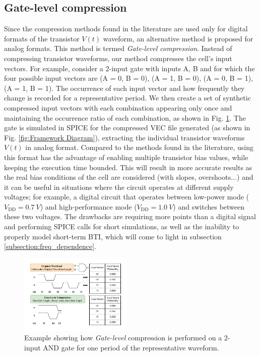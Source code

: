 \subsection{Gate-level compression}
Since the compression methods found in the literature are used only for digital formats of the transistor $V(t)$ waveform, an alternative method is proposed for analog formats. This method is termed \textit{Gate-level compression}. Instead of compressing transistor waveforms, our method compresses the cell's input vectors. For example, consider a 2-input gate with inputs A, B and for which the four possible input vectors are (A = 0, B = 0), (A = 1, B = 0), (A = 0, B = 1), (A = 1, B = 1). The occurrence of each input vector and how frequently they change is recorded for a representative period. We then create a set of synthetic compressed input vectors with each combination appearing only once and maintaining the occurrence ratio of each combination, as shown in Fig. \ref{fig:GateLevelCompression}. The gate is simulated in SPICE for the compressed VEC file generated (as shown in Fig. \ref{fig:Framework Diagram}), extracting the individual transistor waveforms $V(t)$ in analog format. Compared to the methods found in the literature, using this format has the advantage of enabling multiple transistor bias values, while keeping the execution time bounded. This will result in more accurate results as the real bias conditions of the cell are considered (with slopes, overshoots...) and it can be useful in situations where the circuit operates at different supply voltages; for example, a digital circuit that operates between low-power mode ($V_\text{DD}= \qty{0.7}{V}$) and high-performance mode ($V_\text{DD}=\qty{1.0}{V}$) and switches between these two voltages. The drawbacks are requiring more points than a digital signal and performing SPICE calls for short simulations, as well as the inability to properly model short-term BTI, which will come to light in subsection \ref{subsection:freq_dependence}. 

\begin{figure}[!t]
    \includegraphics[width=0.48\textwidth,trim={7mm 5mm 7mm 6mm},clip]{images/ch2/GateLevelCompression.pdf}
    \caption{Example showing how \textit{Gate-level} compression is performed on a 2-input AND gate for one period of the representative waveform. }
    \label{fig:GateLevelCompression}
\end{figure}


